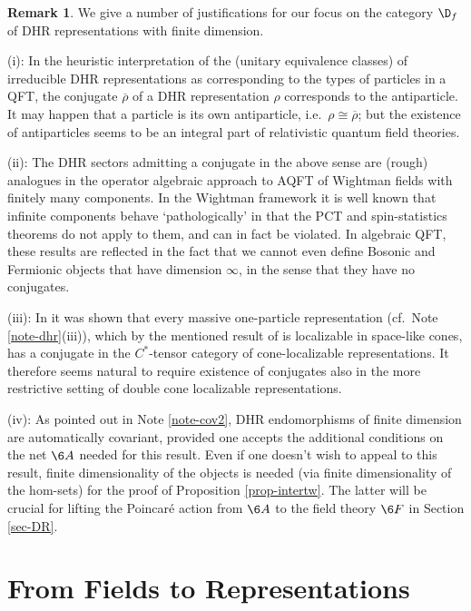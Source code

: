 \documentclass[11pt]{article}
\theoremstyle{definition}
\theoremstyle{definition}
\newtheorem{note}[thm]{Remark}
\theoremstyle{remark}
\def\ol#1{{\overline #1}}
\begin{document}
\begin{note} We give a number of justifications for our
  focus on the category $\D_f$ of DHR representations
  with finite dimension.

  (i): In the heuristic interpretation of the (unitary
  equivalence classes) of irreducible DHR
  representations as corresponding to the types of
  particles in a QFT, the conjugate $\ol{\rho}$ of a
  DHR representation $\rho$ corresponds to the
  antiparticle. It may happen that a particle is its
  own antiparticle, i.e.\ $\rho\cong\ol{\rho}$; but the
  existence of antiparticles seems to be an integral
  part of relativistic quantum field theories.

  (ii): The DHR sectors admitting a conjugate in the
  above sense are (rough) analogues in the operator
  algebraic approach to AQFT of Wightman fields with
  finitely many components. In the Wightman framework
  \cite{SW} it is well known that infinite components
  behave `pathologically' in that the PCT and
  spin-statistics theorems do not apply to them, and
  can in fact be violated. In algebraic QFT, these
  results are reflected in the fact that we cannot even
  define Bosonic and Fermionic objects that have
  dimension $\infty$, in the sense that they have no
  conjugates.

  (iii): In \cite{fred-anti} it was shown that every
  massive one-particle representation (cf.\ Note
  \ref{note-dhr}(iii)), which by the mentioned result
  of \cite{buch-fred} is localizable in space-like
  cones, has a conjugate in the $C^*$-tensor category
  of cone-localizable representations. It therefore
  seems natural to require existence of conjugates also
  in the more restrictive setting of double cone
  localizable representations.

  (iv): As pointed out in Note \ref{note-cov2}, DHR
  endomorphisms of finite dimension are automatically
  covariant, provided one accepts the additional
  conditions on the net $\6A$ needed for this result.
  Even if one doesn't wish to appeal to this result,
  finite dimensionality of the objects is needed (via
  finite dimensionality of the hom-sets) for the proof
  of Proposition \ref{prop-intertw}. The latter will be
  crucial for lifting the Poincar\'e action from $\6A$
  to the field theory $\6F$ in Section \ref{sec-DR}.
\end{note}

\section{From Fields to Representations}  \label{sec-localfield}
\end{document}

